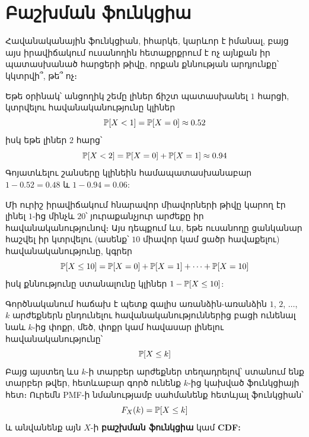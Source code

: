 \section{Բաշխման ֆունկցիա}

Հավանականային ֆունկցիան, իհարկե, կարևոր է իմանալ, բայց այս իրավիճակում ուսանողին հետաքրքրում է ոչ այնքան իր պատասխանած հարցերի թիվը, որքան քննության արդյունքը՝ կկտրվի՞, թե՞ ոչ։ 

Եթե օրինակ՝ անցողիկ շեմը լիներ ճիշտ պատասխանել $1$ հարցի, կտրվելու հավանականությունը կլիներ
\[
\mathbb{P}[X < 1] = \mathbb{P}[X = 0] \approx 0.52
\]
իսկ եթե լիներ $2$ հարց՝
\[
\mathbb{P}[X < 2] = \mathbb{P}[X = 0] + \mathbb{P}[X = 1] \approx 0.94
\]
Գոյատևելու շանսերը կլինեին համապատասխանաբար $1-0.52=0.48$ և $1-0.94=0.06$: 

Մի ուրիշ իրավիճակում հնարավոր միավորների թիվը կարող էր լինել $1$-ից մինչև $20$՝ յուրաքանչյուր արժեքը իր հավանականությունով։ Այս դեպքում ևս, եթե ուսանողը ցանկանար հաշվել իր կտրվելու (ասենք՝ $10$ միավոր կամ ցածր հավաքելու) հավանականությունը, կգրեր
\[
\mathbb{P}[X \le 10] = \mathbb{P}[X = 0] + \mathbb{P}[X = 1] + \dots + \mathbb{P}[X = 10]
\]
իսկ քննությունը ստանալունը կլիներ $1 - \mathbb{P}[X \le 10]$:

Գործնականում հաճախ է պետք գալիս առանձին-առանձին $1$, $2$, $\dots$, $k$ արժեքներն ընդունելու հավանականություններից բացի ունենալ նաև $k$-ից փոքր, մեծ, փոքր կամ հավասար լինելու հավանականությունը՝
\[
\mathbb{P}[X \le k]
\]
Բայց այստեղ ևս $k$-ի տարբեր արժեքներ տեղադրելով՝ ստանում ենք տարբեր թվեր, հետևաբար գործ ունենք $k$-ից կախված ֆունկցիայի հետ։ Ուրեմն 
{\rm PMF}-ի նմանությամբ սահմանենք հետևյալ ֆունկցիան՝
\[
F_X(k) = \mathbb{P}[X \le k]
\]
և անվանենք այն $X$-ի \textbf{բաշխման ֆունկցիա} կամ {\bf CDF:}


